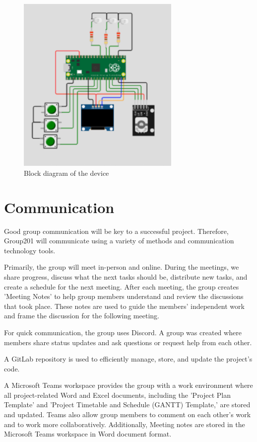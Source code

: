 \documentclass{article}
\begin{document}
\begin{figure}[h]
  \centering
  \includegraphics[width=0.7\textwidth]{project_diagram.png}
  \caption{Block diagram of the device}
  \label{harrin}
\end{figure}


\section{Communication}
Good group communication will be key to a successful project. Therefore, Group201 will communicate using a variety of methods and communication technology tools.

Primarily, the group will meet in-person and online. During the meetings, we share progress, discuss what the next tasks should be, distribute new tasks, and create a schedule for the next meeting. After each meeting, the group creates 'Meeting Notes' to help group members understand and review the discussions that took place. These notes are used to guide the members’ independent work and frame the discussion for the following meeting.

For quick communication, the group uses Discord. A group was created where members share status updates and ask questions or request help from each other.

A GitLab repository is used to efficiently manage, store, and update the project’s code.

A Microsoft Teams workspace provides the group with a work environment where all project-related Word and Excel documents, including the 'Project Plan Template' and 'Project Timetable and Schedule (GANTT) Template,' are stored and updated. Teams also allow group members to comment on each other’s work and to work more collaboratively. Additionally, Meeting notes are stored in the Microsoft Teams workspace in Word document format.
\end{document}
